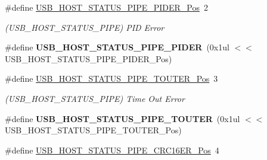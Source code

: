 \begin{DoxyCompactItemize}
\item 
\hypertarget{group___s_a_m_l21___u_s_b_gaba9eac7b3c25d627e8a4e6918270ea11}{}\#define \hyperlink{group___s_a_m_l21___u_s_b_gaba9eac7b3c25d627e8a4e6918270ea11}{U\+S\+B\+\_\+\+H\+O\+S\+T\+\_\+\+S\+T\+A\+T\+U\+S\+\_\+\+P\+I\+P\+E\+\_\+\+P\+I\+D\+E\+R\+\_\+\+Pos}~2\label{group___s_a_m_l21___u_s_b_gaba9eac7b3c25d627e8a4e6918270ea11}

\begin{DoxyCompactList}\small\item\em (U\+S\+B\+\_\+\+H\+O\+S\+T\+\_\+\+S\+T\+A\+T\+U\+S\+\_\+\+P\+I\+P\+E) P\+I\+D Error \end{DoxyCompactList}\item 
\hypertarget{group___s_a_m_l21___u_s_b_ga63b0523dcd5148af4e88ba1f7365bf21}{}\#define {\bfseries U\+S\+B\+\_\+\+H\+O\+S\+T\+\_\+\+S\+T\+A\+T\+U\+S\+\_\+\+P\+I\+P\+E\+\_\+\+P\+I\+D\+E\+R}~(0x1ul $<$$<$ U\+S\+B\+\_\+\+H\+O\+S\+T\+\_\+\+S\+T\+A\+T\+U\+S\+\_\+\+P\+I\+P\+E\+\_\+\+P\+I\+D\+E\+R\+\_\+\+Pos)\label{group___s_a_m_l21___u_s_b_ga63b0523dcd5148af4e88ba1f7365bf21}

\item 
\hypertarget{group___s_a_m_l21___u_s_b_gaa05c55d6a2f68f9c2c329f2adcf4b06d}{}\#define \hyperlink{group___s_a_m_l21___u_s_b_gaa05c55d6a2f68f9c2c329f2adcf4b06d}{U\+S\+B\+\_\+\+H\+O\+S\+T\+\_\+\+S\+T\+A\+T\+U\+S\+\_\+\+P\+I\+P\+E\+\_\+\+T\+O\+U\+T\+E\+R\+\_\+\+Pos}~3\label{group___s_a_m_l21___u_s_b_gaa05c55d6a2f68f9c2c329f2adcf4b06d}

\begin{DoxyCompactList}\small\item\em (U\+S\+B\+\_\+\+H\+O\+S\+T\+\_\+\+S\+T\+A\+T\+U\+S\+\_\+\+P\+I\+P\+E) Time Out Error \end{DoxyCompactList}\item 
\hypertarget{group___s_a_m_l21___u_s_b_gaebf29237fa7a9f994a6be22b705c9faa}{}\#define {\bfseries U\+S\+B\+\_\+\+H\+O\+S\+T\+\_\+\+S\+T\+A\+T\+U\+S\+\_\+\+P\+I\+P\+E\+\_\+\+T\+O\+U\+T\+E\+R}~(0x1ul $<$$<$ U\+S\+B\+\_\+\+H\+O\+S\+T\+\_\+\+S\+T\+A\+T\+U\+S\+\_\+\+P\+I\+P\+E\+\_\+\+T\+O\+U\+T\+E\+R\+\_\+\+Pos)\label{group___s_a_m_l21___u_s_b_gaebf29237fa7a9f994a6be22b705c9faa}

\item 
\hypertarget{group___s_a_m_l21___u_s_b_gadde1b1b8ff5f47767f92c4b67b8fd9d7}{}\#define \hyperlink{group___s_a_m_l21___u_s_b_gadde1b1b8ff5f47767f92c4b67b8fd9d7}{U\+S\+B\+\_\+\+H\+O\+S\+T\+\_\+\+S\+T\+A\+T\+U\+S\+\_\+\+P\+I\+P\+E\+\_\+\+C\+R\+C16\+E\+R\+\_\+\+Pos}~4\label{group___s_a_m_l21___u_s_b_gadde1b1b8ff5f47767f92c4b67b8fd9d7}


\end{DoxyCompactItemize}
